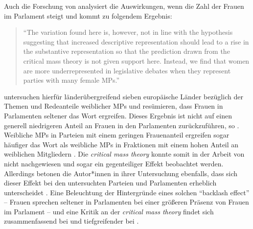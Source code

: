 \documentclass[12pt, 
    twoside=false, 
    bibliography=totoc, 
    numbers=endperiod, 
    headings=normal, 
    toc=chapterentrydotfill
    ]{scrbook}
\begin{document}

Auch die Forschung von \textcite{back_2018} analysiert die Auswirkungen, wenn die Zahl der Frauen im Parlament steigt und kommt zu folgendem Ergebnis: 

\citereset
\begin{quote}
  \enquote{The variation found here is, however, not in line with the hypothesis suggesting that increased descriptive representation should lead to a rise in the substantive representation so that the prediction drawn from the critical mass theory is not given support here. Instead, we find that women are more underrepresented in legislative debates when they represent parties with many female MPs.}
  \parencite[17]{back_2018}
\end{quote}


\textcite{back_2018} untersuchen hierfür länderübergreifend sieben europäische Länder bezüglich der Themen und Redeanteile weiblicher MPs und resümieren, dass Frauen in Parlamenten seltener das Wort ergreifen. Dieses Ergebnis ist nicht auf einen generell niedrigeren Anteil an Frauen in den Parlamenten zurückzuführen, so \textcite{back_2018}. Weibliche MPs in Parteien mit einem geringen Frauenanteil ergreifen sogar häufiger das Wort als weibliche MPs in Fraktionen mit einem hohen Anteil an weiblichen Mitgliedern \parencite*[17]{back_2018}. Die \emph{critical mass theory} konnte somit in der Arbeit von \textcite{back_2018} nicht nachgewiesen und sogar ein gegenteiliger Effekt beobachtet werden. Allerdings betonen die Autor*innen in ihrer Untersuchung ebenfalls, dass sich dieser Effekt bei den untersuchten Parteien und Parlamenten erheblich unterscheidet \parencite[17]{back_2018}. Eine Beleuchtung der Hintergründe eines solchen \enquote{backlash effect} -- Frauen sprechen seltener in Parlamenten bei einer größeren Präsenz von Frauen im Parlament -- und eine Kritik an der \emph{critical mass theory} findet sich zusammenfassend bei \textcite[4]{back_2018} und tiefgreifender bei \textcite{childs_2008}.
\end{document}

